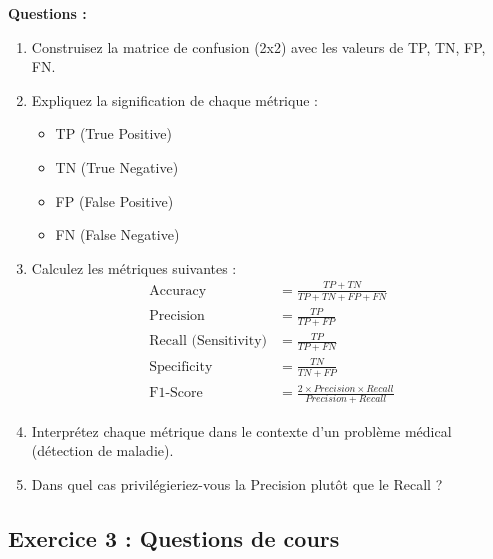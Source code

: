 \documentclass[11pt,a4paper]{article}
\begin{document}
\begin{questionbox}
\textbf{Questions :}
\begin{enumerate}
    \item Construisez la matrice de confusion (2x2) avec les valeurs de TP, TN, FP, FN.
    
    \item Expliquez la signification de chaque métrique :
    \begin{itemize}
        \item TP (True Positive)
        \item TN (True Negative)
        \item FP (False Positive)
        \item FN (False Negative)
    \end{itemize}
    
    \item Calculez les métriques suivantes :
    \begin{align*}
    \text{Accuracy} &= \frac{TP + TN}{TP + TN + FP + FN} \\
    \text{Precision} &= \frac{TP}{TP + FP} \\
    \text{Recall (Sensitivity)} &= \frac{TP}{TP + FN} \\
    \text{Specificity} &= \frac{TN}{TN + FP} \\
    \text{F1-Score} &= \frac{2 \times Precision \times Recall}{Precision + Recall}
    \end{align*}
    
    \item Interprétez chaque métrique dans le contexte d'un problème médical (détection de maladie).
    
    \item Dans quel cas privilégieriez-vous la Precision plutôt que le Recall ?
\end{enumerate}
\end{questionbox}

\subsection{Exercice 3 : Questions de cours}
\end{document}
